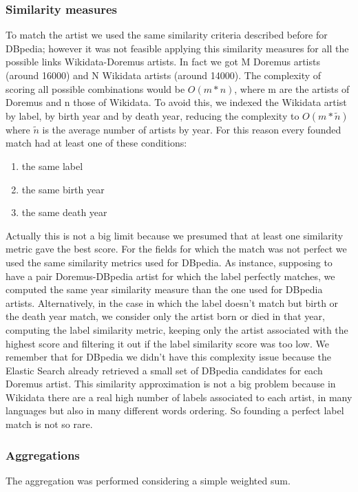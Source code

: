 \documentclass[paper=a4, fontsize=11pt]{scrartcl}
\begin{document}
\subsubsection{Similarity measures}
To match the artist we used the same similarity criteria described before for DBpedia; however it was not feasible applying this similarity measures for all the possible links Wikidata-Doremus artists. In fact we got M Doremus artists (around 16000)  and N Wikidata artists (around 14000). The complexity of scoring all possible combinations would be $O(m*n)$, where m are the artists of Doremus and n those of Wikidata. To avoid this, we indexed the Wikidata artist by label, by birth year and by death year, reducing the complexity to $O(m*\tilde{n})$ where $\tilde{n}$ is the average number of artists by year.
For this reason every founded match had at least one of these conditions: 
\begin{enumerate}
\item the same label
\item the same birth year
\item the same death year
\end{enumerate}
Actually this is not a big limit because we presumed that at least one similarity metric gave the best score.
For the fields for which the match was not perfect we used the same similarity metrics used for DBpedia.
As instance, supposing to have a pair Doremus-DBpedia artist for which the label perfectly matches, we computed the same year similarity measure than the one used for DBpedia artists. Alternatively, in the case in which the label doesn't match but birth or the death year match, we consider only the artist born or died in that year, computing the label similarity metric, keeping only the artist associated with the highest score and filtering it out if the label similarity score was too low.
We remember that for DBpedia we didn't have this complexity issue because the Elastic Search already retrieved a small set of DBpedia candidates for each Doremus artist.
This similarity approximation is not a big problem because in Wikidata there are a real high number of labels associated to each artist, in many languages but also in many different words ordering. So founding a perfect label match is not so rare.

\subsubsection{Aggregations}
The aggregation was performed considering a simple weighted sum.
\end{document}
